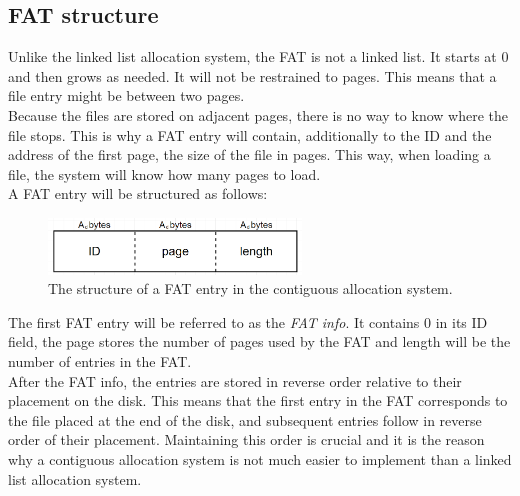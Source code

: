 \documentclass[10pt,a4paper]{ULBreport}
\begin{document}
\subsection{FAT structure}
\label{sec:FAT_CA}
Unlike the linked list allocation system, the FAT is not a linked list. It starts at 0 and then grows as needed. It will not be restrained to pages. This means that a file entry might be between two pages.\\
Because the files are stored on adjacent pages, there is no way to know where the file stops. This is why a FAT entry will contain, additionally to the ID and the address of the first page, the size of the file in pages. This way, when loading a file, the system will know how many pages to load. \\
A FAT entry will be structured as follows:
\begin{figure}[H]
    \centering
    \includegraphics[width=0.6\textwidth]{FAT_entry_CA.png}
    \caption{The structure of a FAT entry in the contiguous allocation system.}
    \label{fig:FAT_C}
\end{figure}
The first FAT entry will be referred to as the \textit{FAT info}. It contains 0 in its ID field, the page stores the number of pages used by the FAT and length will be the number of entries in the FAT. \\
After the FAT info, the entries are stored in reverse order relative to their placement on the disk. This means that the first entry in the FAT corresponds to the file placed at the end of the disk, and subsequent entries follow in reverse order of their placement. Maintaining this order is crucial and it is the reason why a contiguous allocation system is not much easier to implement than a linked list allocation system.\\
\end{document}

